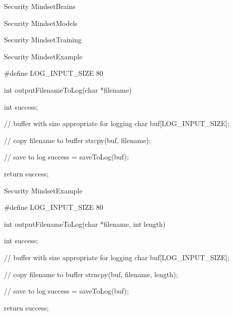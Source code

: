 \begin{slide}{Security Mindset}{Brains}
  \begin{nicscolumn}
  \end{nicscolumn}
\end{slide}

\begin{slide}{Security Mindset}{Models}
  \begin{nicscolumn}
  \end{nicscolumn}
\end{slide}

\begin{slide}{Security Mindset}{Training}
  \begin{nicscolumn}

    \kern3cm
  \end{nicscolumn}
\end{slide}

\begin{slide}{Security Mindset}{Example}
  \begin{nicscolumn}
    \begin{nicsextern}[height=6cm]{}
      #define LOG_INPUT_SIZE 80

      int outputFilenameToLog(char *filename) {
        int success;

        // buffer with size appropriate for logging
        char buf[LOG_INPUT_SIZE];

        // copy filename to buffer
        strcpy(buf, filename);

        // save to log
        success = saveToLog(buf);

        return success;
      }
    \end{nicsextern}
  \end{nicscolumn}
\end{slide}

\begin{slide}{Security Mindset}{Example}
  \begin{nicscolumn}
    \begin{nicsextern}[height=6cm]{}
      #define LOG_INPUT_SIZE 80

      int outputFilenameToLog(char *filename, int length) {
        int success;

        // buffer with size appropriate for logging
        char buf[LOG_INPUT_SIZE];

        // copy filename to buffer
        strncpy(buf, filename, length);

        // save to log
        success = saveToLog(buf);

        return success;
      }
    \end{nicsextern}
  \end{nicscolumn}
\end{slide}

